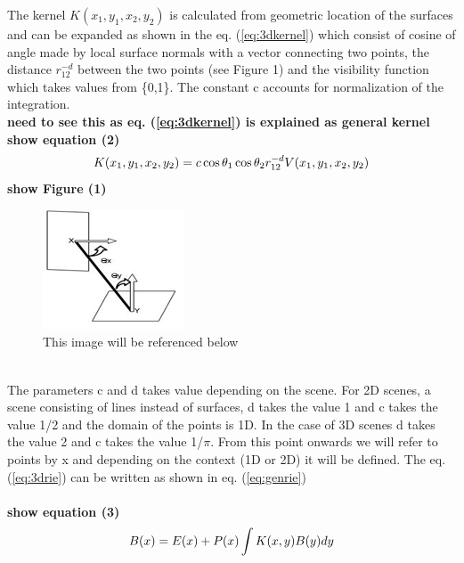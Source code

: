 \documentclass[12pt]{article}
\begin{document}
The kernel $K(x_1,y_1,x_2,y_2)$ is calculated from geometric location of the surfaces and can be expanded as shown in the eq. (\ref{eq:3dkernel}) which consist of cosine of angle made by local surface normals with a vector connecting two points, the distance  $r_{12}^{-d}$ between the two points (see Figure 1) and the visibility function which takes values from \{0,1\}. The constant c accounts for normalization of the integration. \\
{\bf need to see this as eq. (\ref{eq:3dkernel}) is explained as general kernel}\\
{\bf show equation (2)}\\
\begin{equation} \label{eq:3dkernel}
K(x_1,y_1,x_2,y_2) = c \cos \theta_1 \cos \theta_2 r_{12}^{-d} V(x_1,y_1,x_2,y_2) \\ 
\end{equation}
{\bf show Figure (1)}\\
\begin{figure}[h]
\centering
\includegraphics[width=0.4\linewidth]{xy.png}
\caption{This image will be referenced below}
\label{fig:xytheta}
\end{figure}\\
The parameters c and d takes value depending on  the scene. For 2D scenes, a scene consisting of lines instead of surfaces, d takes the value 1 and c takes the value 1/2 and the domain of the points is 1D. In the case of 3D scenes d takes the value 2 and c takes the value 1/$\pi$. From this point onwards we will refer to points by x and depending on the context (1D or  2D) it will be defined. The eq. (\ref{eq:3drie}) can be written as shown in eq. (\ref{eq:genrie})\\\\
{\bf show equation (3)}
\begin{equation} \label{eq:genrie}
B(x)=E(x)+P(x)\int K(x,y)B(y)dy\\\\
\end{equation}
\end{document}
